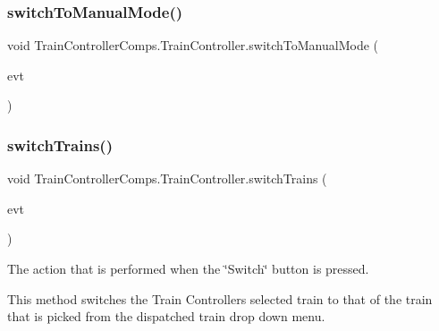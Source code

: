 \mbox{\label{classTrainControllerComps_1_1TrainController_a48dfa3386bc22a0ad919ed3911fc85c7}} 
\subsubsection{\texorpdfstring{switch\+To\+Manual\+Mode()}{switchToManualMode()}}
{\footnotesize\ttfamily void Train\+Controller\+Comps.\+Train\+Controller.\+switch\+To\+Manual\+Mode (\begin{DoxyParamCaption}\item[{java.\+awt.\+event.\+Action\+Event}]{evt }\end{DoxyParamCaption})\hspace{0.3cm}{\ttfamily [private]}}

\mbox{\label{classTrainControllerComps_1_1TrainController_a8f8abe1e5e4895201707befb39537bfe}} 
\subsubsection{\texorpdfstring{switch\+Trains()}{switchTrains()}}
{\footnotesize\ttfamily void Train\+Controller\+Comps.\+Train\+Controller.\+switch\+Trains (\begin{DoxyParamCaption}\item[{java.\+awt.\+event.\+Action\+Event}]{evt }\end{DoxyParamCaption})\hspace{0.3cm}{\ttfamily [private]}}



The action that is performed when the \char`\"{}\+Switch\char`\"{} button is pressed. 

This method switches the Train Controller\textquotesingle{}s selected train to that of the train that is picked from the dispatched train drop down menu.



